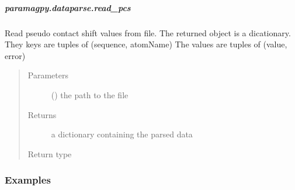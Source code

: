 \documentclass[a4paper,10pt,english,openany,oneside]{sphinxmanual}
\begin{document}
\subparagraph{paramagpy.dataparse.read\_pcs}
\label{\detokenize{reference/generated/paramagpy.dataparse.read_pcs:paramagpy-dataparse-read-pcs}}\label{\detokenize{reference/generated/paramagpy.dataparse.read_pcs::doc}}

\begin{fulllineitems}
\label{\detokenize{reference/generated/paramagpy.dataparse.read_pcs:paramagpy.dataparse.read_pcs}}
Read pseudo contact shift values from file.
The returned object is a dicationary.
They keys are tuples of (sequence, atomName)
The values are tuples of (value, error)
\begin{quote}\begin{description}
\item[{Parameters}] \leavevmode
{} () \textendash{} the path to the file

\item[{Returns}] \leavevmode
{} \textendash{} a dictionary containing the parsed data

\item[{Return type}] \leavevmode
{\hyperref[\detokenize{reference/generated/paramagpy.dataparse.DataContainer:paramagpy.dataparse.DataContainer}]{}}

\end{description}\end{quote}
\subsubsection*{Examples}

%
\begin{sphinxVerbatim}[commandchars=\\\{\}]
  
   
    
\end{sphinxVerbatim}

\end{fulllineitems}
\end{document}

